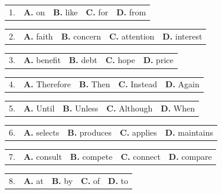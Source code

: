 \documentclass[UTF8,11pt]{ctexart}
\begin{document}
\noindent\begin{tabularx}{\linewidth}{@{}lXXXX@{}}1. & \textbf{A.} on & \textbf{B.} like & \textbf{C.} for & \textbf{D.} from\\\end{tabularx}\par

\noindent\begin{tabularx}{\linewidth}{@{}lXXXX@{}}2. & \textbf{A.} faith & \textbf{B.} concern & \textbf{C.} attention & \textbf{D.} interest\\\end{tabularx}\par

\noindent\begin{tabularx}{\linewidth}{@{}lXXXX@{}}3. & \textbf{A.} benefit & \textbf{B.} debt & \textbf{C.} hope & \textbf{D.} price\\\end{tabularx}\par

\noindent\begin{tabularx}{\linewidth}{@{}lXXXX@{}}4. & \textbf{A.} Therefore & \textbf{B.} Then & \textbf{C.} Instead & \textbf{D.} Again\\\end{tabularx}\par

\noindent\begin{tabularx}{\linewidth}{@{}lXXXX@{}}5. & \textbf{A.} Until & \textbf{B.} Unless & \textbf{C.} Although & \textbf{D.} When\\\end{tabularx}\par

\noindent\begin{tabularx}{\linewidth}{@{}lXXXX@{}}6. & \textbf{A.} selects & \textbf{B.} produces & \textbf{C.} applies & \textbf{D.} maintains\\\end{tabularx}\par

\noindent\begin{tabularx}{\linewidth}{@{}lXXXX@{}}7. & \textbf{A.} consult & \textbf{B.} compete & \textbf{C.} connect & \textbf{D.} compare\\\end{tabularx}\par

\noindent\begin{tabularx}{\linewidth}{@{}lXXXX@{}}8. & \textbf{A.} at & \textbf{B.} by & \textbf{C.} of & \textbf{D.} to\\\end{tabularx}\par
\end{document}

